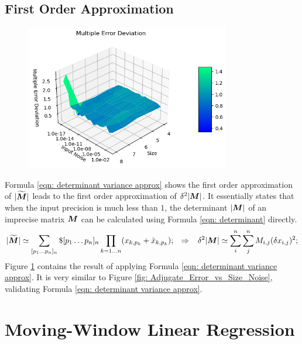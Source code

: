 \documentclass[twoside]{article}
\numberwithin{equation}{section}
\newcommand{\eqspace}{\;\;\;}
\begin{document}
\subsection{First Order Approximation}

\begin{figure}[p]
\centering
\includegraphics[height=2.5in]{Multiply_Error_vs_Size_Noise.png} 
\label{fig: Multiply_Error_vs_Size_Noise}
\end{figure}

Formula \eqref{eqn: determinant variance approx} shows the first order approximation of $|\widetilde{\protect{\textrm{\boldmath $M$}}}|$ leads to the first order approximation of $\delta^2 |\protect{\textrm{\boldmath $M$}}|$.   
It essentially states that when the input precision is much less than $1$, the determinant $|\protect{\textrm{\boldmath $M$}}|$ of an imprecise matrix $\protect{\textrm{\boldmath $M$}}$ can be calculated using Formula \eqref{eqn: determinant} directly.
\begin{equation}
\label{eqn: determinant variance approx}
|\widetilde{\M}| \simeq \sum_{[p_1\dots p_n]_n} \$ [p_1\dots p_n]_n \prod_{k=1 \dots n} (x_{k,p_k} + \tilde{x}_{k,p_k}); \eqspace \Rightarrow  \eqspace
	\delta^2 |\M| \simeq \sum_{i}^{n} \sum_{j}^{n} M_{i,j} (\delta x_{i,j})^2;
\end{equation}
Figure \ref{fig: Multiply_Error_vs_Size_Noise} contains the result of applying Formula \eqref{eqn: determinant variance approx}.
It is very similar to Figure \ref{fig: Adjugate_Error_vs_Size_Noise}, validating Formula \eqref{eqn: determinant variance approx}.






\clearpage
\section{Moving-Window Linear Regression}
\label{sec: Moving-Window Linear Regression}
\end{document}
